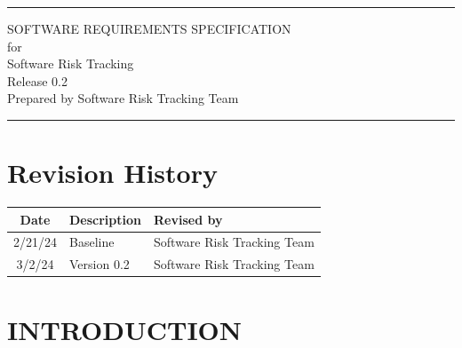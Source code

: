 \documentclass[letterpaper,12pt,oneside,listof=totoc]{scrreprt}
\date{\today}
\author{} %
\def\myversion{0.2}
\begin{document}
\begin{titlepage}
\flushright
\rule{\textwidth}{5pt}\vskip1cm
\Huge{SOFTWARE REQUIREMENTS SPECIFICATION}\\
\vspace{1.5cm}
for\\
\vspace{1.5cm}
Software Risk Tracking\\                      %
\vspace{1.5cm}
\LARGE{Release 0.2\\}
\vspace{1.5cm}
\vspace{1.5cm}
Prepared by Software Risk Tracking Team\\
\vfill
\rule{\textwidth}{5pt}
\end{titlepage}

\tableofcontents

\listoffigures

\newpage

\listoftables

\chapter*{Revision History}

\begin{tabular}{| c | p{} | p{} |}
\hline
Date     & Description   & Revised by \\
\hline
2/21/24 & Baseline & Software Risk Tracking Team \\
\hline
3/2/24 & Version 0.2 & Software Risk Tracking Team \\
\hline
\end{tabular}


\chapter{INTRODUCTION}
\end{document}

